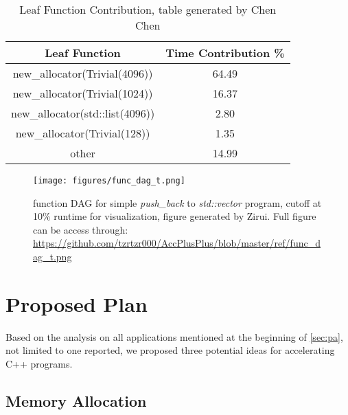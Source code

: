 \documentclass[9pt]{article}
\begin{document}
\begin{table}[htbp]
\begin{center}
\begin{tabular}{|c|c|}
\hline
 \textbf{Leaf Function}&\textbf{Time Contribution \%}\\
\hline
new\_allocator(Trivial(4096)) & 64.49\\
\hline
new\_allocator(Trivial(1024)) & 16.37\\
\hline
new\_allocator(std::list(4096)) & 2.80\\
\hline
new\_allocator(Trivial(128))   & 1.35\\
\hline
other                          & 14.99\\
\hline
\end{tabular}
\caption{Leaf Function Contribution, table generated by Chen Chen}
\label{tab1}
\end{center}
\end{table}

\begin{figure}[t]
    \centering
    \texttt{[image: figures/func\_dag\_t.png]}
    \caption{function DAG for simple \textit{push\_back} to \textit{std::vector} program, cutoff at 10\% runtime for visualization, figure generated by Zirui. Full figure can be access through: \url{https://github.com/tzrtzr000/AccPlusPlus/blob/master/ref/func_dag_t.png}}
    \label{fig:func_dag}
\end{figure}




\section{Proposed Plan}\label{sec:pp}
Based on the analysis on all applications mentioned at the beginning of \ref{sec:pa}, not limited to one reported, we proposed three potential ideas for accelerating C++ programs.  


\subsection{Memory Allocation}\\
\end{document}
